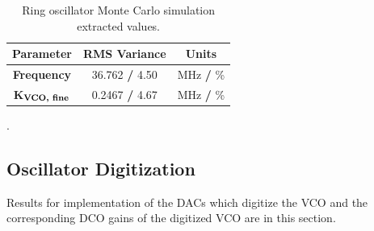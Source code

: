 	\begin{table}[htb!]
		\def\arraystretch{1.5}		
		\setlength\arrayrulewidth{0.75pt}
		\setlength{\tabcolsep}{1em} %
		\begin{tabular}{|c|c|c|}
			\hline 
			\rule[-1ex]{0pt}{2.5ex} \cellcolor{gray!40}\textbf{Parameter} & \cellcolor{gray!40}\textbf{RMS Variance} & \cellcolor{gray!40}\textbf{Units}\\ 
			\hline 
			\rule[-1ex]{0pt}{2.5ex} \textbf{Frequency}&  36.762 \textbf{/} {\color{blue}4.50} &  MHz \textbf{/} {\color{blue}\%}  \\ 
			\hline 
			\rule[-1ex]{0pt}{2.5ex} \textbf{K$_\textnormal{\textbf{VCO, fine}}$} &  0.2467 \textbf{/} {\color{blue}4.67} &  MHz \textbf{/} {\color{blue}\%}  \\ 
			\hline 
		\end{tabular} 
		\caption{Ring oscillator Monte Carlo simulation extracted values.}
		\label{tab:mc_results}
	\end{table}

	{\color{white}.}
\subsection{Oscillator Digitization}
Results for implementation of the DACs which digitize the VCO and the corresponding DCO gains of the digitized VCO are in this section. 
